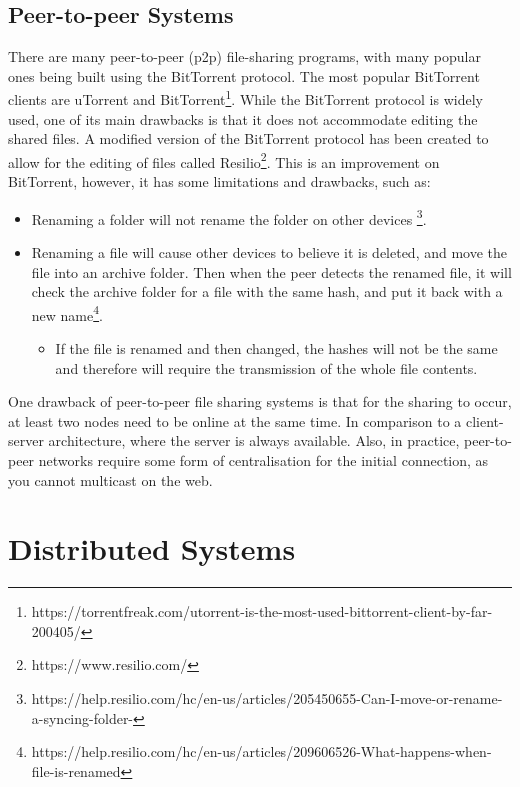 \documentclass[12pt]{report}
\begin{document}
\subsection{Peer-to-peer Systems}
There are many peer-to-peer (p2p) file-sharing programs, with many popular ones being built using the BitTorrent protocol. The most popular BitTorrent clients are uTorrent and BitTorrent\footnote{https://torrentfreak.com/utorrent-is-the-most-used-bittorrent-client-by-far-200405/}. While the BitTorrent protocol is widely used, one of its main drawbacks is that it does not accommodate editing the shared files. A modified version of the  BitTorrent protocol has been created to allow for the editing of files called Resilio\footnote{https://www.resilio.com/}. This is an improvement on BitTorrent, however, it has some limitations and drawbacks, such as:
\begin{itemize}
    \item Renaming a folder will not rename the folder on other devices \footnote{https://help.resilio.com/hc/en-us/articles/205450655-Can-I-move-or-rename-a-syncing-folder-}.
    \item Renaming a file will cause other devices to believe it is deleted, and move the file into an archive folder. Then when the peer detects the renamed file, it will check the archive folder for a file with the same hash, and put it back with a new name\footnote{https://help.resilio.com/hc/en-us/articles/209606526-What-happens-when-file-is-renamed}.
          \begin{itemize}
              \item If the file is renamed and then changed, the hashes will not be the same and therefore will require the transmission of the whole file contents.
          \end{itemize}
\end{itemize}  \par
One drawback of peer-to-peer file sharing systems is that for the sharing to occur, at least two nodes need to be online at the same time. In comparison to a client-server architecture, where the server is always available. Also, in practice, peer-to-peer networks require some form of centralisation for the initial connection, as you cannot multicast on the web.

\section{Distributed Systems}
\end{document}
